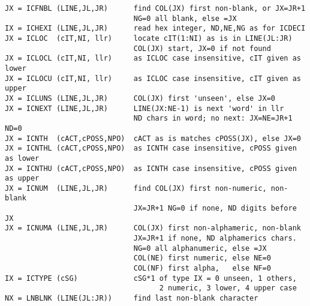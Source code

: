 \begin{verbatim}
JX = ICFNBL (LINE,JL,JR)      find COL(JX) first non-blank, or JX=JR+1
                              NG=0 all blank, else =JX
IX = ICHEXI (LINE,JL,JR)      read hex integer, ND,NE,NG as for ICDECI
JX = ICLOC  (cIT,NI, llr)     locate cIT(1:NI) as is in LINE(JL:JR)
                              COL(JX) start, JX=0 if not found
JX = ICLOCL (cIT,NI, llr)     as ICLOC case insensitive, cIT given as lower
JX = ICLOCU (cIT,NI, llr)     as ICLOC case insensitive, cIT given as upper
JX = ICLUNS (LINE,JL,JR)      COL(JX) first 'unseen', else JX=0
JX = ICNEXT (LINE,JL,JR)      LINE(JX:NE-1) is next 'word' in llr
                              ND chars in word; no next: JX=NE=JR+1 ND=0
JX = ICNTH  (cACT,cPOSS,NPO)  cACT as is matches cPOSS(JX), else JX=0
JX = ICNTHL (cACT,cPOSS,NPO)  as ICNTH case insensitive, cPOSS given as lower
JX = ICNTHU (cACT,cPOSS,NPO)  as ICNTH case insensitive, cPOSS given as upper
JX = ICNUM  (LINE,JL,JR)      find COL(JX) first non-numeric, non-blank
                              JX=JR+1 NG=0 if none, ND digits before JX
JX = ICNUMA (LINE,JL,JR)      COL(JX) first non-alphameric, non-blank
                              JX=JR+1 if none, ND alphamerics chars.
                              NG=0 all alphanumeric, else =JX
                              COL(NE) first numeric, else NE=0
                              COL(NF) first alpha,   else NF=0
IX = ICTYPE (cSG)             cSG*1 of type IX = 0 unseen, 1 others,
                                    2 numeric, 3 lower, 4 upper case
NX = LNBLNK (LINE(JL:JR))     find last non-blank character
\end{verbatim}
